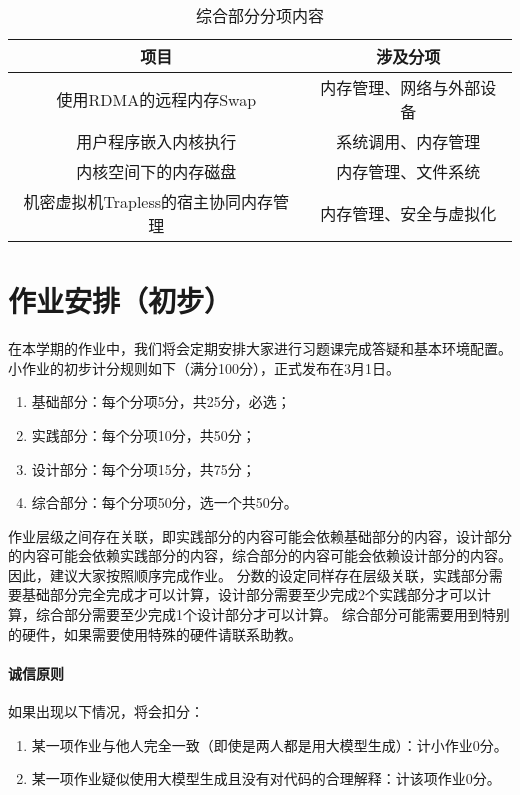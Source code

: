 \begin{table}[htbp]
\centering

\caption{综合部分分项内容}
\label{fig:intro:mixed}
\begin{tabular}{c|c}
\hline
项目              & 涉及分项         \\ \hline
使用RDMA的远程内存Swap & 内存管理、网络与外部设备 \\ \hline
用户程序嵌入内核执行 & 系统调用、内存管理 \\ \hline
内核空间下的内存磁盘 & 内存管理、文件系统 \\ \hline
机密虚拟机Trapless的宿主协同内存管理 & 内存管理、安全与虚拟化 \\ \hline

\end{tabular}

\end{table}

\section{作业安排（初步）}

在本学期的作业中，我们将会定期安排大家进行习题课完成答疑和基本环境配置。小作业的初步计分规则如下（满分100分），正式发布在3月1日。

\begin{enumerate}
    \item 基础部分：每个分项5分，共25分，必选；
    \item 实践部分：每个分项10分，共50分；
    \item 设计部分：每个分项15分，共75分；
    \item 综合部分：每个分项50分，选一个共50分。
\end{enumerate}

作业层级之间存在关联，即实践部分的内容可能会依赖基础部分的内容，设计部分的内容可能会依赖实践部分的内容，综合部分的内容可能会依赖设计部分的内容。因此，建议大家按照顺序完成作业。
分数的设定同样存在层级关联，实践部分需要基础部分完全完成才可以计算，设计部分需要至少完成2个实践部分才可以计算，综合部分需要至少完成1个设计部分才可以计算。
综合部分可能需要用到特别的硬件，如果需要使用特殊的硬件请联系助教。

\paragraph*{诚信原则}
如果出现以下情况，将会扣分：
\begin{enumerate}
    \item 某一项作业与他人完全一致（即使是两人都是用大模型生成）：计小作业0分。
    \item 某一项作业疑似使用大模型生成且没有对代码的合理解释：计该项作业0分。
\end{enumerate}

